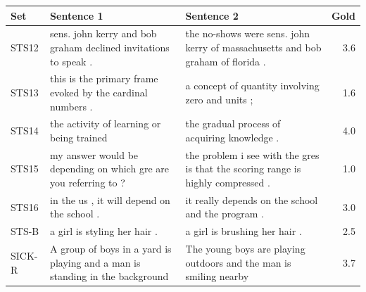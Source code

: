 \setlength{\tabcolsep}{4pt}
\begin{tabularx}{\textwidth}{@{}l>{\raggedright\arraybackslash}X>{\raggedright\arraybackslash}Xr@{}}
\toprule
Set & Sentence 1 & Sentence 2 & Gold \\
\midrule
STS12 & sens. john kerry and bob graham declined invitations to speak . & the no-shows were sens. john kerry of massachusetts and bob graham of florida . & 3.6 \\
STS13 & this is the primary frame evoked by the cardinal numbers . & a concept of quantity involving zero and units ; & 1.6 \\
STS14 & the activity of learning or being trained & the gradual process of acquiring knowledge . & 4.0 \\
STS15 & my answer would be depending on which gre are you referring to ? & the problem i see with the gres is that the scoring range is highly compressed . & 1.0 \\
STS16 & in the us , it will depend on the school . & it really depends on the school and the program . & 3.0 \\
STS-B & a girl is styling her hair . & a girl is brushing her hair . & 2.5 \\
SICK-R & A group of boys in a yard is playing and a man is standing in the background & The young boys are playing outdoors and the man is smiling nearby & 3.7 \\
\bottomrule
\end{tabularx}
